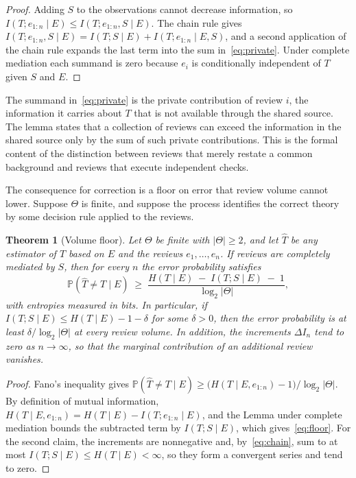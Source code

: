 \documentclass[11pt]{article}
\newtheorem{theorem}{Theorem}
\theoremstyle{remark}
\newcommand{\Prob}{\mathbb{P}}
\begin{document}
\begin{proof}
Adding $S$ to the observations cannot decrease information, so $I(T;e_{1:n}\mid E)\le I(T;e_{1:n},S\mid E)$. The chain rule gives $I(T;e_{1:n},S\mid E)=I(T;S\mid E)+I(T;e_{1:n}\mid E,S)$, and a second application of the chain rule expands the last term into the sum in~\eqref{eq:private}. Under complete mediation each summand is zero because $e_i$ is conditionally independent of $T$ given $S$ and $E$.
\end{proof}

The summand in~\eqref{eq:private} is the private contribution of review $i$, the information it carries about $T$ that is not available through the shared source. The lemma states that a collection of reviews can exceed the information in the shared source only by the sum of such private contributions. This is the formal content of the distinction between reviews that merely restate a common background and reviews that execute independent checks.

The consequence for correction is a floor on error that review volume cannot lower. Suppose $\Theta$ is finite, and suppose the process identifies the correct theory by some decision rule applied to the reviews.

\begin{theorem}[Volume floor]
Let $\Theta$ be finite with $|\Theta|\ge 2$, and let $\hat T$ be any estimator of $T$ based on $E$ and the reviews $e_1,\dots,e_n$. If reviews are completely mediated by $S$, then for every $n$ the error probability satisfies
\begin{equation}
\Prob(\hat T\ne T\mid E)\;\ge\;\frac{H(T\mid E)\;-\;I(T;S\mid E)\;-\;1}{\log_2|\Theta|},
\label{eq:floor}
\end{equation}
with entropies measured in bits. In particular, if $I(T;S\mid E)\le H(T\mid E)-1-\delta$ for some $\delta>0$, then the error probability is at least $\delta/\log_2|\Theta|$ at every review volume. In addition, the increments $\Delta I_n$ tend to zero as $n\to\infty$, so that the marginal contribution of an additional review vanishes.
\end{theorem}

\begin{proof}
Fano's inequality gives $\Prob(\hat T\ne T\mid E)\ge\bigl(H(T\mid E,e_{1:n})-1\bigr)/\log_2|\Theta|$. By definition of mutual information, $H(T\mid E,e_{1:n})=H(T\mid E)-I(T;e_{1:n}\mid E)$, and the Lemma under complete mediation bounds the subtracted term by $I(T;S\mid E)$, which gives~\eqref{eq:floor}. For the second claim, the increments are nonnegative and, by~\eqref{eq:chain}, sum to at most $I(T;S\mid E)\le H(T\mid E)<\infty$, so they form a convergent series and tend to zero.
\end{proof}
\end{document}
